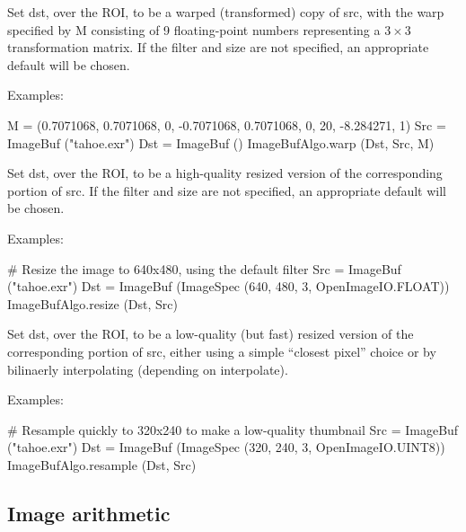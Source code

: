 Set {\cf dst}, over the ROI, to be a warped (transformed) copy of {\cf src},
with the warp specified by {\cf M} consisting of 9 floating-point numbers
representing a $3 \times 3$ transformation matrix.  If the filter and size
are not specified, an appropriate default will be chosen.

\smallskip
\noindent Examples:
\begin{code}
    M = (0.7071068, 0.7071068, 0, -0.7071068, 0.7071068, 0, 20, -8.284271, 1)
    Src = ImageBuf ("tahoe.exr")
    Dst = ImageBuf ()
    ImageBufAlgo.warp (Dst, Src, M)
\end{code}
\apiend


 
Set {\cf dst}, over the ROI, to be a high-quality resized version of the
corresponding portion of {\cf src}.  If the filter and size are not
specified, an appropriate default will be chosen.

\smallskip
\noindent Examples:
\begin{code}
    # Resize the image to 640x480, using the default filter
    Src = ImageBuf ("tahoe.exr")
    Dst = ImageBuf (ImageSpec (640, 480, 3, OpenImageIO.FLOAT))
    ImageBufAlgo.resize (Dst, Src)
\end{code}
\apiend


 
Set {\cf dst}, over the ROI, to be a low-quality (but fast) resized version
of the corresponding portion of {\cf src}, either using a simple ``closest
pixel'' choice or by bilinaerly interpolating (depending on {\cf
interpolate}).

\smallskip
\noindent Examples:
\begin{code}
    # Resample quickly to 320x240 to make a low-quality thumbnail
    Src = ImageBuf ("tahoe.exr")
    Dst = ImageBuf (ImageSpec (320, 240, 3, OpenImageIO.UINT8))
    ImageBufAlgo.resample (Dst, Src)
\end{code}
\apiend



\subsection{Image arithmetic}
\label{sec:iba:py:arith}

